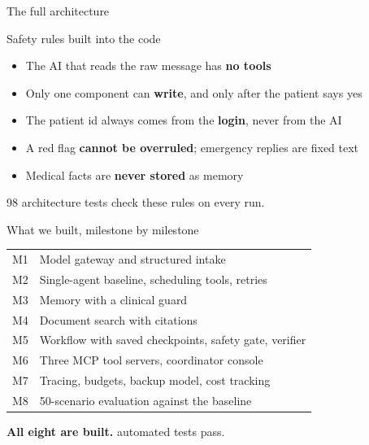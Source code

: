 \documentclass[aspectratio=169,12pt]{beamer}
\begin{document}
\begin{frame}{The full architecture}
{}
\end{frame}

\begin{frame}{Safety rules built into the code}
\begin{itemize}\setlength\itemsep{9pt}
\item The AI that reads the raw message has \textbf{no tools}
\item Only one component can \textbf{write}, and only after the patient says yes
\item The patient id always comes from the \textbf{login}, never from the AI
\item A red flag \textbf{cannot be overruled}; emergency replies are fixed text
\item Medical facts are \textbf{never stored} as memory
\end{itemize}
\vspace{2mm}
{\small 98 architecture tests check these rules on every run.}
\end{frame}

\begin{frame}{What we built, milestone by milestone}
\small
\begin{tabular}{@{}l l@{}}
\toprule
M1 & Model gateway and structured intake \\
M2 & Single-agent baseline, scheduling tools, retries \\
M3 & Memory with a clinical guard \\
M4 & Document search with citations \\
M5 & Workflow with saved checkpoints, safety gate, verifier \\
M6 & Three MCP tool servers, coordinator console \\
M7 & Tracing, budgets, backup model, cost tracking \\
M8 & 50-scenario evaluation against the baseline \\
\bottomrule
\end{tabular}
\vspace{3mm}

{\color{good}\textbf{All eight are built.}}  automated tests pass.
\end{frame}
\end{document}
